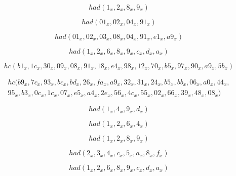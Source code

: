 
\begin{equation}\label{mat:khoo-7}
had(1_x,2_x,8_x,9_x)
\end{equation}

\begin{equation}\label{mat:khoo-8}
had(01_x, 02_x, 04_x, 91_x) 
\end{equation}

\begin{equation}\label{mat:khoo-9}
had(01_x, 02_x, 03_x, 08_x, 04_x, 91_x, e1_x, a9_x)
\end{equation}

\begin{equation}\label{mat:khoo-10}
had(1_x, 2_x, 6_x, 8_x, 9_x, c_x, d_x, a_x)
\end{equation}

\begin{equation}\label{mat:khoo-11}
hc(b1_x, 1c_x, 30_x, 09_x, 08_x, 91_x, 18_x, e4_x, 98_x, 12_x, 70_x, b5_x, 97_x, 90_x, a9_x, 5b_x)
\end{equation}

\begin{align}\label{mat:khoo-12}
hc(b9_x, 7c_x, 93_x, bc_x, bd_x, 26_x, fa_x, a9_x, 32_x, 31_x, 24_x, b5_x, bb_x, 06_x, a0_x, 44_x, \nonumber\\ 95_x, b3_x, 0c_x, 1c_x, 07_x, e5_x, a4_x, 2e_x, 56_x, 4c_x, 55_x, 02_x, 66_x, 39_x, 48_x, 08_x)
\end{align}


\begin{equation}\label{mat:khoo-13}
had(1_x,4_x,9_x,d_x)
\end{equation}

\begin{equation}\label{mat:khoo-14}
had(1_x,2_x,6_x,4_x)
\end{equation}

\begin{equation}\label{mat:khoo-15}
had(1_x,2_x,8_x,9_x)
\end{equation}

\begin{equation}\label{mat:khoo-16}
had(2_x, 3_x, 4_x, c_x, 5_x, a_x, 8_x, f_x)
\end{equation}

\begin{equation}\label{mat:khoo-17}
had(1_x, 2_x, 6_x, 8_x, 9_x, c_x, d_x, a_x)
\end{equation}